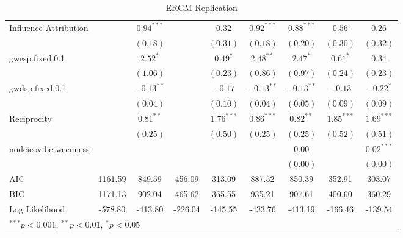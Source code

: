 \documentclass[fleqn,12pt]{wlscirep}
\begin{document}
\begin{landscape}
\begin{table}
\begin{center}
\begin{tabular}{l c c c c c c c c }
Influence Attribution       &               & $0.94^{***}$  &               & $0.32$        & $0.92^{***}$  & $0.88^{***}$  & $0.56$        & $0.26$        \\
                        &               & $(0.18)$      &               & $(0.31)$      & $(0.18)$      & $(0.20)$      & $(0.30)$      & $(0.32)$      \\
gwesp.fixed.0.1         &               & $2.52^{*}$    &               & $0.49^{*}$    & $2.48^{**}$   & $2.47^{*}$    & $0.61^{*}$    & $0.34$        \\
                        &               & $(1.06)$      &               & $(0.23)$      & $(0.86)$      & $(0.97)$      & $(0.24)$      & $(0.23)$      \\
gwdsp.fixed.0.1         &               & $-0.13^{**}$  &               & $-0.17$       & $-0.13^{**}$  & $-0.13^{**}$  & $-0.13$       & $-0.22^{*}$   \\
                        &               & $(0.04)$      &               & $(0.10)$      & $(0.04)$      & $(0.05)$      & $(0.09)$      & $(0.09)$      \\
Reciprocity                 &               & $0.81^{**}$   &               & $1.76^{***}$  & $0.86^{***}$  & $0.82^{**}$   & $1.85^{***}$  & $1.69^{***}$  \\
                        &               & $(0.25)$      &               & $(0.50)$      & $(0.25)$      & $(0.25)$      & $(0.52)$      & $(0.51)$      \\
nodeicov.betweenness    &               &               &               &               &               & $0.00$        &               & $0.02^{***}$  \\
                        &               &               &               &               &               & $(0.00)$      &               & $(0.00)$      \\
\hline
AIC                     & 1161.59       & 849.59        & 456.09        & 313.09        & 887.52        & 850.39        & 352.91        & 303.07        \\
BIC                     & 1171.13       & 902.04        & 465.62        & 365.55        & 935.21        & 907.61        & 400.60        & 360.29        \\
Log Likelihood          & -578.80       & -413.80       & -226.04       & -145.55       & -433.76       & -413.19       & -166.46       & -139.54       \\
\hline
\multicolumn{9}{l}{\scriptsize{$^{***}p<0.001$, $^{**}p<0.01$, $^*p<0.05$}}
\end{tabular}
\caption{ERGM Replication}
\label{table:coefficients}
\end{center}
\end{table}
\end{landscape}
\restoregeometry
\end{document}
